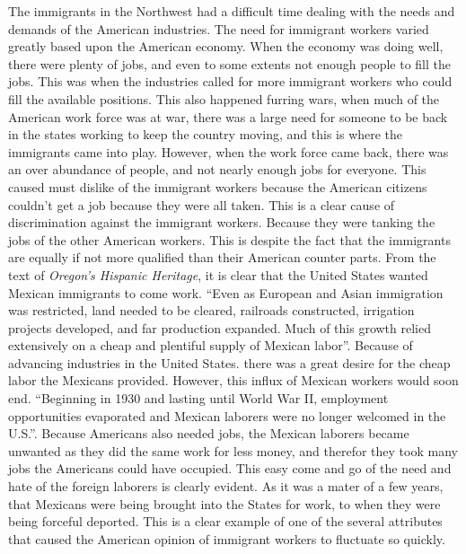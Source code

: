 \documentclass[12pt, twoside]{article}
\begin{document}
The immigrants in the Northwest had a difficult time dealing with the needs and demands of the American industries. The need for immigrant workers varied greatly based upon the American economy. When the economy was doing well, there were plenty of jobs, and even to some extents not enough people to fill the jobs. This was when the industries called for more immigrant workers who could fill the available positions. This also happened furring wars, when much of the American work force was at war, there was a large need for someone to be back in the states working to keep the country moving, and this is where the immigrants came into play. However, when the work force came back, there was an over abundance of people, and not nearly enough jobs for everyone. This caused must dislike of the immigrant workers because the American citizens couldn't get a job because they were all taken. This is a clear cause of discrimination against the immigrant workers. Because they were tanking the jobs of the other American workers. This is despite the fact that the immigrants are equally if not more qualified than their American counter parts. From the text of \emph{Oregon's Hispanic Heritage}, it is clear that the United States wanted Mexican immigrants to come work. ``Even as European and Asian immigration was restricted, land needed to be cleared, railroads constructed, irrigation projects developed, and far production expanded. Much of this growth relied extensively on a cheap and plentiful supply of Mexican labor''\cite{OHH}. Because of advancing industries in the United States. there was a great desire for the cheap labor the Mexicans provided. However, this influx of Mexican workers would soon end. ``Beginning in 1930 and lasting until World War II, employment opportunities evaporated and Mexican laborers were no longer welcomed in the U.S.''\cite[147]{OHH}. Because Americans also needed jobs, the Mexican laborers became unwanted as they did the same work for less money, and therefor they took many jobs the Americans could have occupied. This easy come and go of the need and hate of the foreign laborers is clearly evident. As it was a mater of a few years, that Mexicans were being brought into the States for work, to when they were being forceful deported. This is a clear example of one of the several attributes that caused the American opinion of immigrant workers to fluctuate so quickly.
\par
\end{document}
